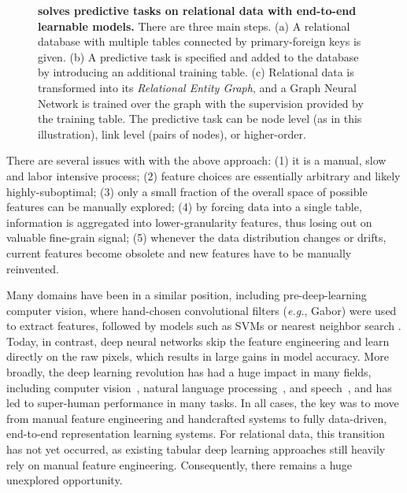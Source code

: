 \begin{figure}[t] %
  \centering
  
  \caption{\textbf{\AreaName solves predictive tasks on relational data with end-to-end learnable models.} There are three main steps. (a) A relational database with multiple tables connected by primary-foreign keys is given. (b) A predictive task is specified and added to the database by introducing an additional training table. (c) Relational data is transformed into its {\em Relational Entity Graph}, and a Graph Neural Network is trained over the graph with the supervision provided by the training table. The predictive task can be node level (as in this illustration), link level (pairs of nodes), or higher-order.}
  \label{fig: high level outline (fig1)}
\end{figure}


There are several issues with with the above approach: (1) it is a manual, slow and labor intensive process; (2) feature choices are essentially arbitrary and likely highly-suboptimal; 
(3) only a small fraction of the overall space of possible features can be manually explored; (4) by forcing data into a single table, information is aggregated into lower-granularity features, thus losing out on valuable fine-grain signal; (5) whenever the data distribution changes or drifts, current features become obsolete and new features have to be manually reinvented.


Many domains have been in a similar position, including pre-deep-learning computer vision, where hand-chosen convolutional filters  (\emph{e.g.}, Gabor) were used to extract features, followed by models such as SVMs or nearest neighbor search \citep{varma2005statistical}. Today, in contrast, deep neural networks skip the feature engineering and learn directly on the raw pixels, which results in large gains in model accuracy.
More broadly, the deep learning revolution has had a huge impact in many fields, including computer vision~\citep{he2016deep,russakovsky2015imagenet}, natural language processing~\citep{vaswani2017attention,devlin2018bert,brown2020language}, and speech~\citep{hannun2014deep,amodei2016deep}, and has led to super-human performance in many tasks. In all cases, the key was to move from manual feature engineering and handcrafted systems to fully data-driven, end-to-end representation learning systems.
For relational data, this transition has not yet occurred, as existing tabular deep learning approaches still heavily rely on manual feature engineering. 
Consequently, there remains a huge unexplored opportunity.


